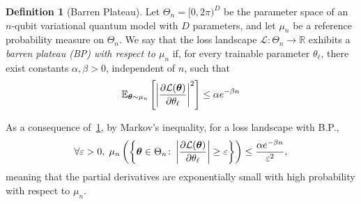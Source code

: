 \documentclass{article}
\theoremstyle{plain}
\theoremstyle{definition}
\newtheorem{definition}[theorem]{Definition}
\theoremstyle{remark}
\begin{document}
\begin{definition}[Barren Plateau] \label{def:bp}
Let $\Theta_n=[0,2\pi)^D$ be the parameter space of an $n$-qubit variational quantum
model with $D$ parameters, and let $\mu_n$ be a reference probability measure on $\Theta_n$.
We say that the loss landscape $\mathcal L:\Theta_n \to \mathbb{R}$ exhibits a \emph{barren plateau (BP) with respect to $\mu_n$} if, for every trainable parameter $\theta_\ell$, there exist constants $\alpha,\beta>0$, independent of $n$, such that
$$
\mathbb E_{{\bm{\theta}}\sim\mu_n}
\left[
\left|
\frac{\partial \mathcal L({\bm{\theta}})}{\partial \theta_\ell}
\right|^2
\right]
\le \alpha e^{-\beta n} 
$$
\end{definition}
As a consequence of~\cref{def:bp}, by Markov's inequality, for a loss landscape with B.P., \begin{equation}
    \forall \varepsilon>0,\; \mu_n\left(\left\{ {\bm{\theta}}\in\Theta_n \colon \left| \frac{\partial \mathcal L({\bm{\theta}})}{\partial \theta_\ell} \right| \ge \varepsilon \right\} \right) \le \frac{\alpha e^{-\beta n}}{\varepsilon^2},
\end{equation}
meaning that the partial derivatives are exponentially small with high probability
with respect to $\mu_n$.
\end{document}
